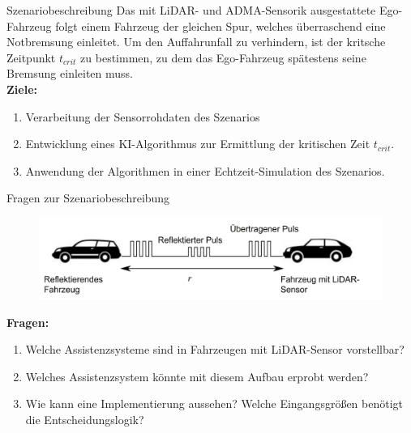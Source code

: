 \documentclass[169, handout	]{THIbeamer} %
\begin{document}
	\begin{frame}{Szenariobeschreibung}
		Das mit LiDAR- und ADMA-Sensorik ausgestattete Ego-Fahrzeug folgt einem Fahrzeug der gleichen Spur, welches überraschend eine Notbremsung einleitet. Um den Auffahrunfall zu verhindern, ist der kritsche Zeitpunkt $t_{crit}$ zu bestimmen, zu dem das Ego-Fahrzeug spätestens seine Bremsung einleiten muss.
		\\
		\textbf{Ziele:} \\
		\begin{enumerate}
			\item Verarbeitung der Sensorrohdaten des Szenarios
			\item Entwicklung eines KI-Algorithmus zur Ermittlung der kritischen Zeit $t_{crit}$.
			\item Anwendung der Algorithmen in einer Echtzeit-Simulation des Szenarios.
		\end{enumerate}
	\end{frame}
	\begin{frame}{Fragen zur Szenariobeschreibung}
		\begin{figure}

			\includegraphics[scale=0.4]{"required/Szenariobeschreibung_auto.jpg"}

		\end{figure}	
		\textbf{Fragen:}\\
		\begin{enumerate}
			\item Welche Assistenzsysteme sind in Fahrzeugen mit LiDAR-Sensor vorstellbar?
			\item Welches Assistenzsystem könnte mit diesem Aufbau erprobt werden?
			\item Wie kann eine Implementierung aussehen? Welche Eingangsgrößen benötigt die Entscheidungslogik?
		\end{enumerate}
	\end{frame}
\end{document}
